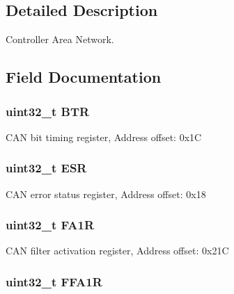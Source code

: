 \subsection{Detailed Description}
Controller Area Network. 

\subsection{Field Documentation}
\hypertarget{struct_c_a_n___type_def_a5c0fcd3e7b4c59ab1dd68f6bd8f74e07}{
\subsubsection[{B\-T\-R}]{ uint32\-\_\-t B\-T\-R}}\label{struct_c_a_n___type_def_a5c0fcd3e7b4c59ab1dd68f6bd8f74e07}
C\-A\-N bit timing register, Address offset\-: 0x1\-C \hypertarget{struct_c_a_n___type_def_a2b39f943954e0e7d177b511d9074a0b7}{
\subsubsection[{E\-S\-R}]{ uint32\-\_\-t E\-S\-R}}\label{struct_c_a_n___type_def_a2b39f943954e0e7d177b511d9074a0b7}
C\-A\-N error status register, Address offset\-: 0x18 \hypertarget{struct_c_a_n___type_def_aaf76271f4ab0b3deb3ceb6e2ac0d62d0}{
\subsubsection[{F\-A1\-R}]{ uint32\-\_\-t F\-A1\-R}}\label{struct_c_a_n___type_def_aaf76271f4ab0b3deb3ceb6e2ac0d62d0}
C\-A\-N filter activation register, Address offset\-: 0x21\-C \hypertarget{struct_c_a_n___type_def_af1405e594e39e5b34f9499f680157a25}{
\subsubsection[{F\-F\-A1\-R}]{ uint32\-\_\-t F\-F\-A1\-R}}\label{struct_c_a_n___type_def_af1405e594e39e5b34f9499f680157a25}

